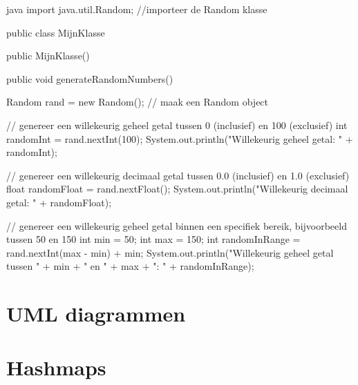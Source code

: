 \documentclass[a4paper,11pt]{article}
\begin{document}
\begin{codeblock}[random]{java}
    import java.util.Random; //importeer de Random klasse

    public class MijnKlasse 
    {
    
    public MijnKlasse() {
    }

    public void generateRandomNumbers() {
        Random rand = new Random(); // maak een Random object

        // genereer een willekeurig geheel getal tussen 0 (inclusief) en 100 (exclusief)
        int randomInt = rand.nextInt(100);
        System.out.println("Willekeurig geheel getal: " + randomInt);

        // genereer een willekeurig decimaal getal tussen 0.0 (inclusief) en 1.0 (exclusief)
        float randomFloat = rand.nextFloat();
        System.out.println("Willekeurig decimaal getal: " + randomFloat);

        // genereer een willekeurig geheel getal binnen een specifiek bereik, bijvoorbeeld tussen 50 en 150
        int min = 50;
        int max = 150;
        int randomInRange = rand.nextInt(max - min) + min;
        System.out.println("Willekeurig geheel getal tussen " + min + " en " + max + ": " + randomInRange);
    }
}
\end{codeblock}

\section{UML diagrammen}

\section{Hashmaps} 

\end{document}
